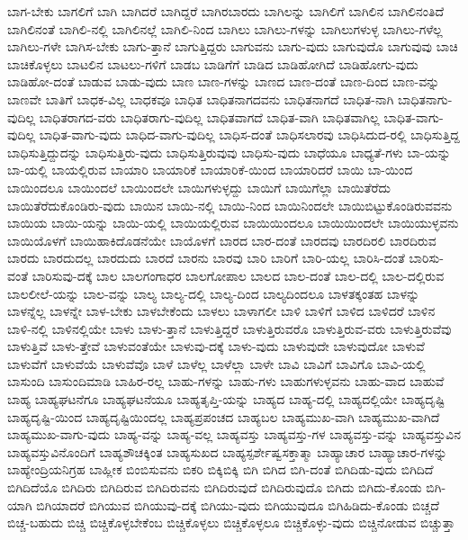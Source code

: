 {ಬಾಗ-ಬೇಕು
ಬಾಗಲಿಗೆ
ಬಾಗಿ
ಬಾಗಿದರೆ
ಬಾಗಿದ್ದರೆ
ಬಾಗಿರಬಾರದು
ಬಾಗಿಲನ್ನು
ಬಾಗಿಲಿಗೆ
ಬಾಗಿಲಿನ
ಬಾಗಿಲಿನಂತಿದೆ
ಬಾಗಿಲಿನಂತೆ
ಬಾಗಿಲಿ-ನಲ್ಲಿ
ಬಾಗಿಲಿನಲ್ಲೆ
ಬಾಗಿಲಿ-ನಿಂದ
ಬಾಗಿಲು
ಬಾಗಿಲು-ಗಳನ್ನು
ಬಾಗಿಲುಗಳುಳ್ಳ
ಬಾಗಿಲು-ಗಳೆಲ್ಲ
ಬಾಗಿಲು-ಗಳೇ
ಬಾಗಿಸ-ಬೇಕು
ಬಾಗು-ತ್ತಾನೆ
ಬಾಗುತ್ತಿದ್ದರು
ಬಾಗುವನು
ಬಾಗು-ವುದು
ಬಾಗುವುದೊ
ಬಾಗುವುವು
ಬಾಚಿ
ಬಾಚಿಕೊಳ್ಳಲು
ಬಾಟಲಿನ
ಬಾಟಲು-ಗಳಿಗೆ
ಬಾಡಬ
ಬಾಡಿಗೆಗೆ
ಬಾಡಿದ
ಬಾಡಿಹೋಗಿದೆ
ಬಾಡಿಹೋಗು-ವುದು
ಬಾಡಿಹೋ-ದಂತೆ
ಬಾಡುವ
ಬಾಡು-ವುದು
ಬಾಣ
ಬಾಣ-ಗಳನ್ನು
ಬಾಣದ
ಬಾಣ-ದಂತೆ
ಬಾಣ-ದಿಂದ
ಬಾಣ-ವನ್ನು
ಬಾಣವೇ
ಬಾತಿಗೆ
ಬಾಧಕ-ವಿಲ್ಲ
ಬಾಧಕವೂ
ಬಾಧಿತ
ಬಾಧಿತನಾಗದವನು
ಬಾಧಿತನಾಗದೆ
ಬಾಧಿತ-ನಾಗಿ
ಬಾಧಿತನಾಗು-ವುದಿಲ್ಲ
ಬಾಧಿತರಾಗದ-ವರು
ಬಾಧಿತರಾಗು-ವುದಿಲ್ಲ
ಬಾಧಿತವಾಗದೆ
ಬಾಧಿತ-ವಾಗಿ
ಬಾಧಿತವಾಗಿಲ್ಲ
ಬಾಧಿತ-ವಾಗು-ವುದಿಲ್ಲ
ಬಾಧಿತ-ವಾಗು-ವುದು
ಬಾಧಿದ-ವಾಗು-ವುದಿಲ್ಲ
ಬಾಧಿಸ-ದಂತೆ
ಬಾಧಿಸಲಾರವು
ಬಾಧಿಸಿದುದ-ರಲ್ಲಿ
ಬಾಧಿಸುತ್ತಿದ್ದ
ಬಾಧಿಸುತ್ತಿದ್ದುದನ್ನು
ಬಾಧಿಸುತ್ತಿರು-ವುದು
ಬಾಧಿಸುತ್ತಿರುವುವು
ಬಾಧಿಸು-ವುದು
ಬಾಧೆಯೂ
ಬಾಧ್ಯತೆ-ಗಳು
ಬಾ-ಯನ್ನು
ಬಾ-ಯಲ್ಲಿ
ಬಾಯಲ್ಲಿರುವ
ಬಾಯಾರಿ
ಬಾಯಾರಿಕೆ
ಬಾಯಾರಿಕೆ-ಯಿಂದ
ಬಾಯಾರಿದರೆ
ಬಾಯಿ
ಬಾ-ಯಿಂದ
ಬಾಯಿಂದಲೂ
ಬಾಯಿಂದಲೆ
ಬಾಯಿಂದಲೇ
ಬಾಯಿಗಳುಳ್ಳದ್ದು
ಬಾಯಿಗೆ
ಬಾಯಿಗೆಲ್ಲಾ
ಬಾಯಿತೆರೆದು
ಬಾಯಿತೆರೆದುಕೊಂಡಿರು-ವುದು
ಬಾಯಿನ
ಬಾಯಿ-ನಲ್ಲಿ
ಬಾಯಿ-ನಿಂದ
ಬಾಯಿನಿಂದಲೇ
ಬಾಯಿಬಿಟ್ಟುಕೊಂಡಿರುವವನು
ಬಾಯಿಯ
ಬಾಯಿ-ಯನ್ನು
ಬಾಯಿ-ಯಲ್ಲಿ
ಬಾಯಿಯಲ್ಲಿರುವ
ಬಾಯಿಯಿಂದಲೂ
ಬಾಯಿಯಿಂದಲೇ
ಬಾಯಿಯುಳ್ಳವನು
ಬಾಯಿಯೊಳಗೆ
ಬಾಯಿಹಾಕಿದೊಡನೆಯೇ
ಬಾಯೊಳಗೆ
ಬಾರದ
ಬಾರ-ದಂತೆ
ಬಾರದವು
ಬಾರದಿರಲಿ
ಬಾರದಿರುವ
ಬಾರದು
ಬಾರದುದಲ್ಲ
ಬಾರದುದು
ಬಾರದೆ
ಬಾರನು
ಬಾರವು
ಬಾರಿ
ಬಾರಿಗೆ
ಬಾರಿ-ಯಲ್ಲ
ಬಾರಿಸಿ-ದಂತೆ
ಬಾರಿಸು-ವಂತೆ
ಬಾರಿಸುವು-ದಕ್ಕೆ
ಬಾಲ
ಬಾಲಗಂಗಾಧರ
ಬಾಲಗೋಪಾಲ
ಬಾಲದ
ಬಾಲ-ದಂತೆ
ಬಾಲ-ದಲ್ಲಿ
ಬಾಲ-ದಲ್ಲಿರುವ
ಬಾಲಲೀಲೆ-ಯನ್ನು
ಬಾಲ-ವನ್ನು
ಬಾಲ್ಯ
ಬಾಲ್ಯ-ದಲ್ಲಿ
ಬಾಲ್ಯ-ದಿಂದ
ಬಾಲ್ಯದಿಂದಲೂ
ಬಾಳತಕ್ಕಂತಹ
ಬಾಳನ್ನು
ಬಾಳನ್ನೆಲ್ಲ
ಬಾಳನ್ನೇ
ಬಾಳ-ಬೇಕು
ಬಾಳಬೇಕೆಂದು
ಬಾಳಲು
ಬಾಳಾಗಲೀ
ಬಾಳಿ
ಬಾಳಿಗೆ
ಬಾಳಿದ
ಬಾಳಿದರೆ
ಬಾಳಿನ
ಬಾಳಿ-ನಲ್ಲಿ
ಬಾಳಿನಲ್ಲಿಯೇ
ಬಾಳು
ಬಾಳು-ತ್ತಾನೆ
ಬಾಳುತ್ತಿದ್ದರೆ
ಬಾಳುತ್ತಿರುವರೊ
ಬಾಳುತ್ತಿರುವ-ವರು
ಬಾಳುತ್ತಿರುವೆವು
ಬಾಳುತ್ತಿವೆ
ಬಾಳು-ತ್ತೇವೆ
ಬಾಳುವಂತೆಯೇ
ಬಾಳುವು-ದಕ್ಕೆ
ಬಾಳು-ವುದು
ಬಾಳುವುದೇ
ಬಾಳುವುದೋ
ಬಾಳುವೆ
ಬಾಳುವೆಗೆ
ಬಾಳುವೆಯೆ
ಬಾಳುವೆವೊ
ಬಾಳೆ
ಬಾಳೆಲ್ಲ
ಬಾಳೆಲ್ಲಾ
ಬಾಳೇ
ಬಾವಿ
ಬಾವಿಗೆ
ಬಾವಿಗೊ
ಬಾವಿ-ಯಲ್ಲಿ
ಬಾಸುಂದಿ
ಬಾಸುಂದಿಮಾಡಿ
ಬಾಹಿರ-ರಲ್ಲ
ಬಾಹು-ಗಳನ್ನು
ಬಾಹು-ಗಳು
ಬಾಹುಗಳುಳ್ಳವನು
ಬಾಹು-ವಾದ
ಬಾಹುವೆ
ಬಾಹ್ಯ
ಬಾಹ್ಯಘಟನೆಗೂ
ಬಾಹ್ಯಘಟನೆಯೂ
ಬಾಹ್ಯತೃಪ್ತಿ-ಯನ್ನು
ಬಾಹ್ಯದ
ಬಾಹ್ಯ-ದಲ್ಲಿ
ಬಾಹ್ಯದಲ್ಲಿಯೇ
ಬಾಹ್ಯದೃಷ್ಟಿ
ಬಾಹ್ಯದೃಷ್ಟಿ-ಯಿಂದ
ಬಾಹ್ಯದೃಷ್ಟಿಯಿಂದಲ್ಲ
ಬಾಹ್ಯಪ್ರಪಂಚದ
ಬಾಹ್ಯಬಲ
ಬಾಹ್ಯಮುಖ-ವಾಗಿ
ಬಾಹ್ಯಮುಖ-ವಾಗಿದೆ
ಬಾಹ್ಯಮುಖ-ವಾಗು-ವುದು
ಬಾಹ್ಯ-ವನ್ನು
ಬಾಹ್ಯ-ವಲ್ಲ
ಬಾಹ್ಯವಸ್ತು
ಬಾಹ್ಯವಸ್ತು-ಗಳ
ಬಾಹ್ಯವಸ್ತು-ವನ್ನು
ಬಾಹ್ಯವಸ್ತುವಿನ
ಬಾಹ್ಯವಸ್ತುವಿನೊಂದಿಗೆ
ಬಾಹ್ಯಶೌಚಕ್ಕಿಂತ
ಬಾಹ್ಯಸುಖದ
ಬಾಹ್ಯಸ್ಪರ್ಶೇಷ್ವಸಕ್ತಾತ್ಮಾ
ಬಾಹ್ಯಾಚಾರ
ಬಾಹ್ಯಾಚಾರ-ಗಳನ್ನು
ಬಾಹ್ಯೇಂದ್ರಿಯನಿಗ್ರಹ
ಬಾಹ್ಲೀಕ
ಬಿಂಬಿಸುವನು
ಬಿಕರಿ
ಬಿಕ್ಕಿಬಿಕ್ಕಿ
ಬಿಗಿ
ಬಿಗಿದ
ಬಿಗಿ-ದಂತೆ
ಬಿಗಿದಿಡು-ವುದು
ಬಿಗಿದಿದೆ
ಬಿಗಿದಿದೆಯೊ
ಬಿಗಿದಿರು
ಬಿಗಿದಿರುವ
ಬಿಗಿದಿರುವನು
ಬಿಗಿದಿರುವುದೆ
ಬಿಗಿದಿರುವುದೊ
ಬಿಗಿದು
ಬಿಗಿದು-ಕೊಂಡು
ಬಿಗಿ-ಯಾಗಿ
ಬಿಗಿಯಾದರೆ
ಬಿಗಿಯುವ
ಬಿಗಿಯುವು-ದಕ್ಕೆ
ಬಿಗಿಯು-ವುದು
ಬಿಗಿಯುವುದೂ
ಬಿಗಿಹಿಡಿದು-ಕೊಂಡು
ಬಿಚ್ಚದೆ
ಬಿಚ್ಚ-ಬಹುದು
ಬಿಚ್ಚಿ
ಬಿಚ್ಚಿಕೊಳ್ಳಬೇಕೆಂಬ
ಬಿಚ್ಚಿಕೊಳ್ಳಲು
ಬಿಚ್ಚಿಕೊಳ್ಳಲೂ
ಬಿಚ್ಚಿಕೊಳ್ಳು-ವುದು
ಬಿಚ್ಚಿನೋಡುವ
ಬಿಚ್ಚುತ್ತಾ
}
